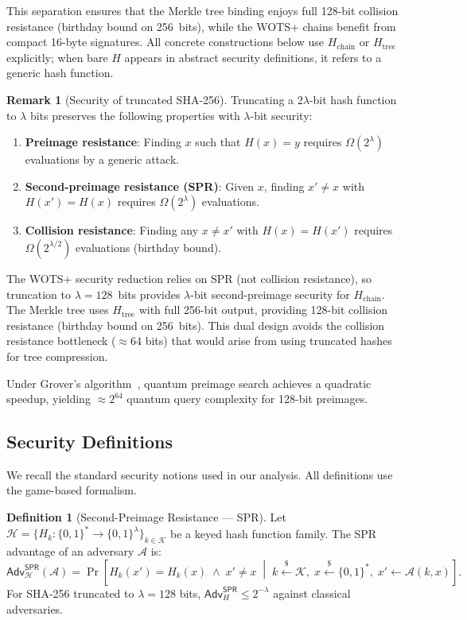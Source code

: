 \documentclass[11pt,a4paper]{article}
\theoremstyle{definition}
\newtheorem{definition}[theorem]{Definition}
\newtheorem{remark}[theorem]{Remark}
\begin{document}
This separation ensures that the Merkle tree binding enjoys full 128-bit collision resistance (birthday bound on 256~bits), while the WOTS+ chains benefit from compact 16-byte signatures. All concrete constructions below use $H_{\mathrm{chain}}$ or $H_{\mathrm{tree}}$ explicitly; when bare $H$ appears in abstract security definitions, it refers to a generic hash function.

\begin{remark}[Security of truncated SHA-256]
Truncating a $2\lambda$-bit hash function to $\lambda$ bits preserves the following properties with $\lambda$-bit security:
\begin{enumerate}[nosep]
    \item \textbf{Preimage resistance}: Finding $x$ such that $H(x) = y$ requires $\Omega(2^\lambda)$ evaluations by a generic attack.
    \item \textbf{Second-preimage resistance (SPR)}: Given $x$, finding $x' \neq x$ with $H(x') = H(x)$ requires $\Omega(2^\lambda)$ evaluations.
    \item \textbf{Collision resistance}: Finding any $x \neq x'$ with $H(x) = H(x')$ requires $\Omega(2^{\lambda/2})$ evaluations (birthday bound).
\end{enumerate}
The WOTS+ security reduction relies on SPR (not collision resistance), so truncation to $\lambda = 128$~bits provides $\lambda$-bit second-preimage security for $H_{\mathrm{chain}}$. The Merkle tree uses $H_{\mathrm{tree}}$ with full 256-bit output, providing 128-bit collision resistance (birthday bound on 256~bits). This dual design avoids the collision resistance bottleneck ($\approx 64$ bits) that would arise from using truncated hashes for tree compression.

Under Grover's algorithm~\cite{grover1996fast}, quantum preimage search achieves a quadratic speedup, yielding $\approx 2^{64}$ quantum query complexity for 128-bit preimages.
\end{remark}

\subsection{Security Definitions}
\label{sec:security-defs}

We recall the standard security notions used in our analysis. All definitions use the game-based formalism.

\begin{definition}[Second-Preimage Resistance --- SPR]
\label{def:spr}
Let $\mathcal{H} = \{H_k : \{0,1\}^* \to \{0,1\}^\lambda\}_{k \in \mathcal{K}}$ be a keyed hash function family. The SPR advantage of an adversary $\mathcal{A}$ is:
$$
\mathsf{Adv}^{\mathsf{SPR}}_{\mathcal{H}}(\mathcal{A}) = \Pr\left[
    H_k(x') = H_k(x) \;\land\; x' \neq x
    \;\middle|\;
    k \xleftarrow{\$} \mathcal{K},\;
    x \xleftarrow{\$} \{0,1\}^*,\;
    x' \leftarrow \mathcal{A}(k, x)
\right].
$$
For SHA-256 truncated to $\lambda = 128$ bits, $\mathsf{Adv}^{\mathsf{SPR}}_H \leq 2^{-\lambda}$ against classical adversaries.
\end{definition}
\end{document}
